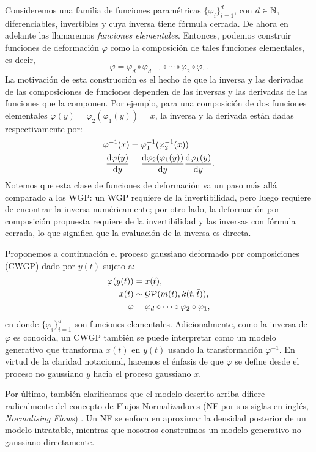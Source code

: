 Consideremos una familia de funciones paramétricas \(\{\varphi_i\}_{i=1}^d\), con \(d \in \mathbb{N}\), diferenciables, invertibles y cuya inversa tiene fórmula cerrada. De ahora en adelante las llamaremos \emph{funciones elementales}. Entonces, podemos construir funciones de deformación \(\varphi\) como la composición de tales funciones elementales, es decir,
\begin{equation*}
	\varphi = \varphi_d \circ \varphi_{d-1} \circ \dotsb \circ \varphi_{2} \circ \varphi_1.
\end{equation*}
La motivación de esta construcción es el hecho de que la inversa y las derivadas de las composiciones de funciones dependen de las inversas y las derivadas de las funciones que la componen. Por ejemplo, para una composición de dos funciones elementales \(\varphi(y) = \varphi_{2}(\varphi_{1}(y)) = x\), la inversa y la derivada están dadas respectivamente por:
\begin{align*}
	\varphi^{-1}(x)		&= \varphi_{1}^{-1}(\varphi_{2}^{-1}(x)) \\
	\dv{\varphi(y)}{y}	&= \dv{\varphi_{2}(\varphi_{1}(y))}{y} \dv{\varphi_{1}(y)}{y}.
\end{align*}
Notemos que esta clase de funciones de deformación va un paso más allá comparado a los WGP: un WGP requiere de la invertibilidad, pero luego requiere de encontrar la inversa numéricamente; por otro lado, la deformación por composición propuesta requiere de la invertibilidad y las inversas con fórmula cerrada, lo que significa que la evaluación de la inversa es directa.

Proponemos a continuación el proceso gaussiano deformado por composiciones (CWGP) dado por \(y(t)\) sujeto a:
\begin{align*}
	\varphi(y(t))	&= x(t),\\
	x(t)			&\sim \operatorname{\mathcal{GP}}(m(t), k(t, \bar{t})),\\
	\varphi			&= \varphi_d \circ \dotsb \circ \varphi_2 \circ \varphi_1,
\end{align*}
en donde \(\{\varphi_i\}_{i=1}^d\) son funciones elementales. Adicionalmente, como la inversa de \(\varphi\) es conocida, un CWGP también se puede interpretar como un modelo generativo que transforma \(x(t)\) en \(y(t)\) usando la transformación \(\varphi^{-1}\). En virtud de la claridad notacional, hacemos el énfasis de que \(\varphi\) se define desde el proceso no gaussiano \(y\) hacia el proceso gaussiano \(x\).

Por último, también clarificamos que el modelo descrito arriba difiere radicalmente del concepto de Flujos Normalizadores (NF por sus siglas en inglés, \emph{Normalising Flows}) \cite{tabak2010,tabak2013,rezende2015variational}. Un NF se enfoca en aproximar la densidad posterior de un modelo intratable, mientras que nosotros construimos un modelo generativo no gaussiano directamente.


